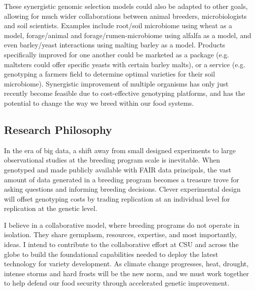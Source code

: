 \documentclass[11pt]{article}
\begin{document}
These synergistic genomic selection models could also be adapted to other goals, allowing for much wider collaborations between animal breeders, microbiologists and soil scientists. Examples include root/soil microbiome using wheat as a model, forage/animal and forage/rumen-microbiome using alfalfa as a model, and even barley/yeast interactions using malting barley as a model. Products specifically improved for one another could be marketed as a package (e.g. maltsters could offer specific yeasts with certain barley malts), or a service (e.g. genotyping a farmers field to determine optimal varieties for their soil microbiome). Synergistic improvement of multiple organisms has only just recently become feasible due to cost-effective genotyping platforms, and has the potential to change the way we breed within our food systems. 



\subsection*{Research Philosophy}

In the era of big data, a shift away from small designed experiments to large observational studies at the breeding program scale is inevitable. When genotyped and made publicly available with FAIR data principals, the vast amount of data generated in a breeding program becomes a treasure trove for asking questions and informing breeding decisions. Clever experimental design will offset genotyping costs by trading replication at an individual level for replication at the genetic level.

I believe in a collaborative model, where breeding programs do not operate in isolation. They share germplasm, resources, expertise, and most importantly, ideas. I intend to contribute to the collaborative effort at CSU and across the globe to build the foundational capabilities needed to deploy the latest technology for variety development. As climate change progresses, heat, drought, intense storms and hard frosts will be the new norm, and we must work together to help defend our food security through accelerated genetic improvement. 


\end{document}

